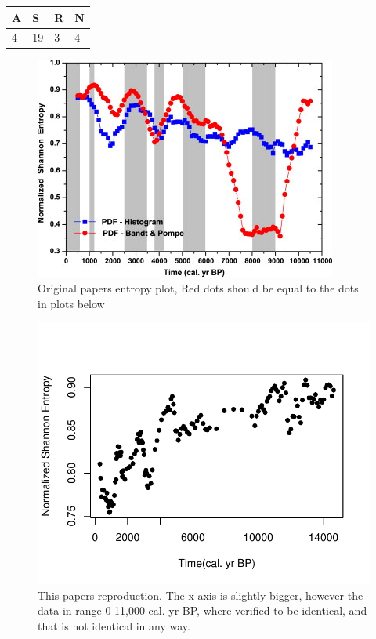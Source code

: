 \begin{table}[]
\begin{tabular}{|l|l|l|l|}
\hline
A & S  & R & N \\ \hline
4 & 19 & 3 & 4 \\ \hline
\end{tabular}
\end{table}

\begin{figure}
    \centering
    \includegraphics[width=\textwidth,keepaspectratio]{ElNino/ArticleEntropyPlot.jpg}
    \caption{Original papers entropy plot, Red dots should be equal to the dots in plots below}
\end{figure}

\begin{figure}
    \centering
    \includegraphics[width=\textwidth,keepaspectratio]{ElNino/Entropy.pdf}
    \caption{This papers reproduction. The x-axis is slightly bigger, however the data in range 0-11,000 cal. yr BP, where verified to be identical, and that is not identical in any way.}
\end{figure}